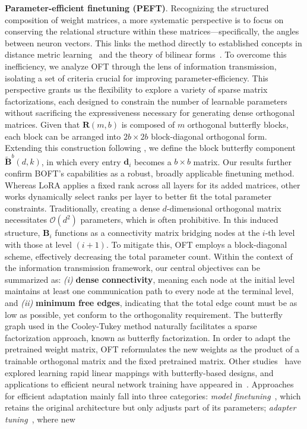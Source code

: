 \begin{theorem}
\textbf{Parameter-efficient finetuning (PEFT)}. Recognizing the structured composition of weight matrices, a more systematic perspective is to focus on conserving the relational structure within these matrices—specifically, the angles between neuron vectors. This links the method directly to established concepts in distance metric learning~\cite{xing2002distance} and the theory of bilinear forms~\cite{roman2005advanced}. To overcome this inefficiency, we analyze OFT through the lens of information transmission, isolating a set of criteria crucial for improving parameter-efficiency. This perspective grants us the flexibility to explore a variety of sparse matrix factorizations, each designed to constrain the number of learnable parameters without sacrificing the expressiveness necessary for generating dense orthogonal matrices. Given that $\bm{R}(m,b)$ is composed of $m$ orthogonal butterfly blocks, each block can be arranged into $2b\times 2b$ block-diagonal orthogonal form. Extending this construction following \cite{chen2022pixelated}, we define the block butterfly component $\tilde{\bm{B}}^b(d,k)$, in which every entry $\bm{d}_i$ becomes a $b\times b$ matrix. Our results further confirm BOFT's capabilities as a robust, broadly applicable finetuning method. Whereas LoRA applies a fixed rank across all layers for its added matrices, other works \cite{zhang2022adaptive,valipour2022dylora,zhang2023increlora} dynamically select ranks per layer to better fit the total parameter constraints. Traditionally, creating a dense $d$-dimensional orthogonal matrix necessitates $\mathcal{O}(d^2)$ parameters, which is often prohibitive. In this induced structure, $\bm{B}_i$ functions as a connectivity matrix bridging nodes at the $i$-th level with those at level $(i+1)$. To mitigate this, OFT employs a block-diagonal scheme, effectively decreasing the total parameter count. Within the context of the information transmission framework, our central objectives can be summarized as: \emph{(i)} \textbf{dense connectivity}, meaning each node at the initial level maintains at least one communication path to every node at the terminal level, and \emph{(ii)} \textbf{minimum free edges}, indicating that the total edge count must be as low as possible, yet conform to the orthogonality requirement. The butterfly graph used in the Cooley-Tukey method naturally facilitates a sparse factorization approach, known as butterfly factorization. In order to adapt the pretrained weight matrix, OFT reformulates the new weights as the product of a trainable orthogonal matrix and the fixed pretrained matrix. Other studies~\cite{dao2019learning,dao2019kaleidoscope} have explored learning rapid linear mappings with butterfly-based designs, and applications to efficient neural network training have appeared in~\cite{chen2022pixelated,dao2022monarch}. Approaches for efficient adaptation mainly fall into three categories: \emph{model finetuning}~\cite{hulora2022,zaken2022bitfit,guo2020parameter,raffel2020exploring,qiu2023controlling,zhang2022adaptive,chavan2023one}, which retains the original architecture but only adjusts part of its parameters; \emph{adapter tuning}~\cite{rebuffi2017learning,houlsby2019parameter,pfeiffer2020adapterfusion,lin2020exploring,he2021towards}, where new 
\end{theorem}
